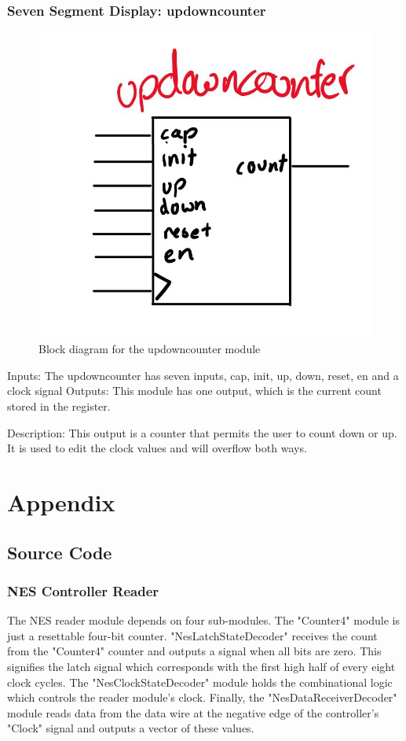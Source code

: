 \documentclass[a4paper]{article}
\begin{document}
\subsubsection{Seven Segment Display: updowncounter}
\begin{figure}[H]
    \includegraphics[width=0.8 \linewidth]{images/updowncounter.JPG}
    \caption{Block diagram for the updowncounter module}
    \label{updowncounter}
\end{figure}

Inputs: The updowncounter has seven inputs, cap, init, up, down, reset, en and a clock signal
Outputs: This module has one output, which is the current count stored in the register.

Description: This output is a counter that permits the user to count down or up. It is used to edit the clock values and will overflow both ways.

\section{Appendix}

\subsection{Source Code}%

\subsubsection{NES Controller Reader}
The NES reader module depends on four sub-modules. 
The "Counter4" module is just a resettable four-bit counter.
"NesLatchStateDecoder" receives the count from the "Counter4" counter and outputs a signal when all bits are zero. This signifies the latch signal which corresponds with the first high half of every eight clock cycles.
The "NesClockStateDecoder" module holds the combinational logic which controls the reader module's clock. 
Finally, the "NesDataReceiverDecoder" module reads data from the data wire at the negative edge of the controller's "Clock" signal and outputs a vector of these values. 
\end{document}
